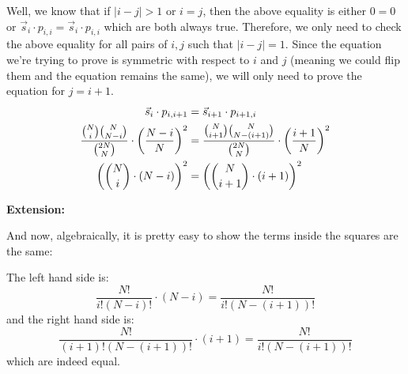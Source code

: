 \documentclass[11.5pt]{article}
\begin{document}
\begin{solution}{3}
\begin{enumerate}
Well, we know that if $|i-j| > 1$ or $i =j$, then the above equality is either $0 = 0$ or $\vec{s}_i \cdot p_{i,i} = \vec{s}_i \cdot p_{i,i}$ which are both always true. Therefore, we only need to check the above equality for all pairs of $i,j$ such that $|i-j| = 1$. Since the equation we're trying to prove is symmetric with respect to $i$ and $j$ (meaning we could flip them and the equation remains the same), we will only need to prove the equation for $j = i+1$. 
\begin{align*}
\vec{s}_i \cdot p_{i, i+1} &= \vec{s}_{i+1} \cdot p_{i+1, i} \\
\frac{{N \choose i}{N \choose {N - i} }}{{2N \choose N}} \cdot \left( \frac{N-i}{N} \right)^2 &= \frac{{N \choose i+1}{N \choose {N - (i+1)} }}{{2N \choose N}} \cdot \left( \frac{i+1}{N} \right)^2\\ 
\left({N \choose i} \cdot (N-i)\right)^2 &= \left({N \choose i+1} \cdot (i+1)\right)^2
\end{align*}

\textbf{Extension: }

And now, algebraically, it is pretty easy to show the terms inside the squares are the same: 

The left hand side is: 
$$ \frac{N!}{i!(N-i)!} \cdot (N-i) = \frac{N!}{i! (N-(i+1))!}$$
and the right hand side is: 
$$ \frac{N!}{(i+1)!(N-(i+1))!} \cdot (i+1) = \frac{N!}{i!(N-(i+1))!}$$ which are indeed equal. 

\end{enumerate}
\end{solution}
\end{document}
